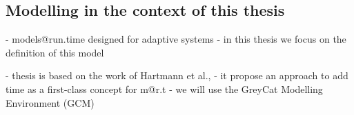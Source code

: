 \subsection{Modelling in the context of this thesis}

- models@run.time designed for adaptive systems
- in this thesis we focus on the definition of this model

- thesis is based on the work of Hartmann et al.,
- it propose an approach to add time as a first-class concept for m@r.t
- we will use the GreyCat Modelling Environment (GCM)

